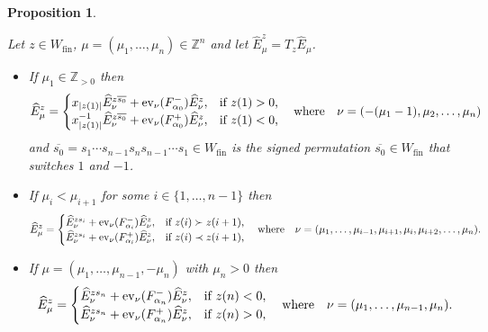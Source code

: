 \documentclass[11pt]{article}
\theoremstyle{plain}
\newtheorem{prop}[thm]{Proposition}
\theoremstyle{definition}
\theoremstyle{remark}
\numberwithin{equation}{section}
\def\ZZ{\mathbb{Z}}
\def\ev{\mathrm{ev}}
\newcounter{r}
\newcounter{s}
\begin{document}
\begin{prop}\label{alcwksteps}

Let $z\in W_{\mathrm{fin}}$, $\mu= (\mu_1, \ldots, \mu_n)\in \ZZ^n$ and let $\widehat{E}^z_\mu = T_z \widehat{E}_\mu$.
\begin{itemize}
\item[(a)] If 
$\mu_1\in \ZZ_{>0}$ 
then
$$\widehat{E}^z_\mu = \begin{cases}
x_{\vert z(1)\vert} \widehat{E}^{z\overline{s_0}}_\nu+ \ev_\nu(F_{\alpha_0}^-) \widehat{E}^z_\nu, &\hbox{if $z(1)>0$,} \\
x^{-1}_{\vert z(1)\vert} \widehat{E}^{z\overline{s_0}}_\nu+ \ev_\nu(F_{\alpha_0}^+) \widehat{E}^z_\nu, &\hbox{if $z(1)<0$,} 
\end{cases}
\quad\hbox{where}\quad
\nu = (-(\mu_1-1), \mu_2, \ldots, \mu_n)
$$
and $\overline{s_0} = s_1\cdots s_{n-1} s_n s_{n-1} \cdots s_1\in W_{\mathrm{fin}}$ is the 
signed permutation  $\overline{s_0}\in W_{\mathrm{fin}}$ that switches $1$ and $-1$.
\item[(b)] 
If  $\mu_i < \mu_{i+1}$ for some $i\in \{1, \ldots, n-1\}$ then 
$$\widehat{E}^z_\mu = \begin{cases}
\widehat{E}^{zs_i}_\nu+ \ev_\nu(F_{\alpha_i}^-) \widehat{E}^z_\nu, &\hbox{if $z(i)\succ z(i+1)$,} \\
\widehat{E}^{zs_i}_\nu+ \ev_\nu(F_{\alpha_i}^+) \widehat{E}^z_\nu, &\hbox{if $z(i)\prec z(i+1)$,} 
\end{cases}
\quad\hbox{where}\quad
\nu = (\mu_1, \ldots, \mu_{i-1}, \mu_{i+1}, \mu_i, \mu_{i+2}, \ldots, \mu_n).
$$
\item[(c)] 
If  $\mu = (\mu_1, \ldots, \mu_{n-1}, -\mu_n)$ with $\mu_n>0$
then
$$\widehat{E}^z_\mu = \begin{cases}
\widehat{E}^{zs_n}_\nu+ \ev_\nu(F_{\alpha_n}^-) \widehat{E}^z_\nu, &\hbox{if $z(n)<0$,} \\
\widehat{E}^{zs_n}_\nu+ \ev_\nu(F_{\alpha_n}^+) \widehat{E}^z_\nu, &\hbox{if $z(n)>0$,} 
\end{cases}
\quad\hbox{where}\quad
\nu = (\mu_1, \ldots, \mu_{n-1}, \mu_n).
$$
\end{itemize}
\end{prop}
\end{document}

